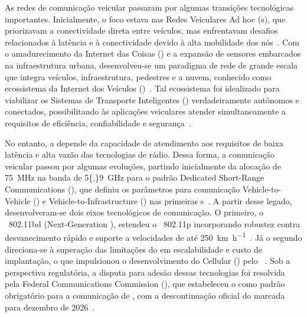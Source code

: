 As redes de comunicação veicular passaram por algumas transições tecnológicas importantes. Inicialmente, o foco estava nas Redes Veiculares Ad hoc (s), que priorizavam a conectividade direta entre veículos, mas enfrentavam desafios relacionados à latência e à conectividade devido à alta mobilidade dos nós~\cite{kandali2025}. Com o amadurecimento da Internet das Coisas () e a expansão de sensores embarcados na infraestrutura urbana, desenvolveu-se um paradigma de rede de grande escala que integra veículos, infraestrutura, pedestres e a nuvem, conhecido como ecossistema da Internet dos Veículos ()~\cite{kandali2025}. Tal ecossistema foi idealizado para viabilizar os Sistemas de Transporte Inteligentes () verdadeiramente autônomos e conectados, possibilitando às aplicações veiculares atender simultaneamente a requisitos de eficiência, confiabilidade e segurança~\cite{uddin2025}.

No entanto, a  depende da capacidade de atendimento aos requisitos de baixa latência e alta vazão das tecnologias de rádio. Dessa forma, a comunicação veicular passou por algumas evoluções, partindo inicialmente da alocação de \SI{75}{\mega\hertz} na banda de \SI{5{,}9}{\giga\hertz} para o padrão Dedicated Short-Range Communications (), que definiu os parâmetros para comunicação Vehicle-to-Vehicle () e Vehicle-to-Infrastructure () nas primeiras s~\cite{zheng2015}. A partir desse legado, desenvolveram-se dois eixos tecnológicos de comunicação. O primeiro, o ~802.11bd (Next-Generation ), estendeu o ~802.11p incorporando robustez contra desvanecimento rápido e suporte a velocidades de até \SI{250}{\kilo\meter\per\hour}~\cite{naik2019}. Já o segundo direciona-se à superação das limitações do  em escalabilidade e custo de implantação, o que impulsionou o desenvolvimento do Cellular  () pelo ~\cite{chen2017}. Sob a perspectiva regulatória, a disputa para adesão dessas tecnologias foi resolvida pela Federal Communications Commission (), que estabeleceu o  como padrão obrigatório para a comunicação de , com a descontinuação oficial do  marcada para dezembro de 2026~\cite{fcc2024_59ghz}.

